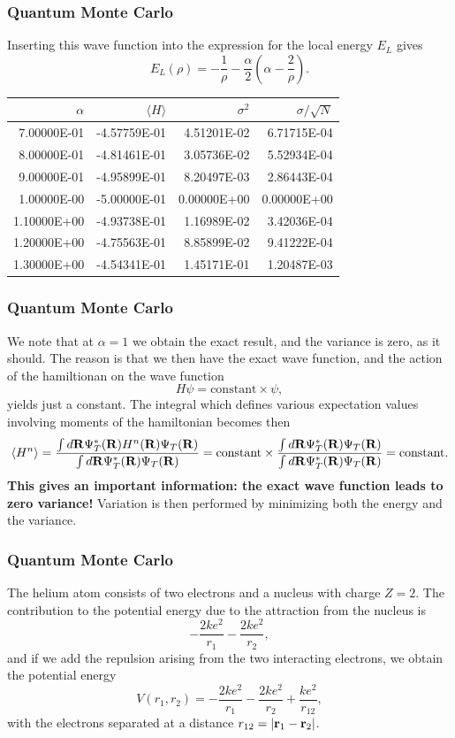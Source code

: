 \documentclass[compress]{beamer}
\begin{document}
\frame
{
  \frametitle{Quantum Monte Carlo}
\begin{small}
{\scriptsize
Inserting this wave function into the expression for the
local energy $E_L$ gives
\[
   E_L(\rho)=-\frac{1}{\rho}-
              \frac{\alpha}{2}\left(\alpha-\frac{2}{\rho}\right).
\]

\begin{tabular}{rrrr}\hline
$\alpha$&$\langle H \rangle $&$\sigma^2$&$\sigma/\sqrt{N}$ \\\hline
 7.00000E-01 & -4.57759E-01 &  4.51201E-02 &  6.71715E-04 \\ 
 8.00000E-01 & -4.81461E-01 &  3.05736E-02 &  5.52934E-04 \\ 
 9.00000E-01 & -4.95899E-01 &  8.20497E-03 &  2.86443E-04 \\ 
 1.00000E-00 & -5.00000E-01 &  0.00000E+00 &  0.00000E+00 \\ 
 1.10000E+00 & -4.93738E-01 &  1.16989E-02 &  3.42036E-04 \\ 
 1.20000E+00 & -4.75563E-01 &  8.85899E-02 &  9.41222E-04 \\ 
 1.30000E+00 & -4.54341E-01 &  1.45171E-01 &  1.20487E-03 \\ 
\end{tabular}
}
\end{small}
}


\frame
{
  \frametitle{Quantum Monte Carlo}
\begin{small}
{\scriptsize
We note that at $\alpha=1$ we obtain the exact
result, and the variance is zero, as it should. The reason is that 
we then have the exact wave function, and the action of the hamiltionan
on the wave function
\[
   H\psi = \mathrm{constant}\times \psi,
\]
yields just a constant. The integral which defines various 
expectation values involving moments of the hamiltonian becomes then
\[
   \langle H^n \rangle =
   \frac{\int d{\bf R}\Psi^{\ast}_T({\bf R})H^n({\bf R})\Psi_T({\bf R})}
        {\int d{\bf R}\Psi^{\ast}_T({\bf R})\Psi_T({\bf R})}=
\mathrm{constant}\times\frac{\int d{\bf R}\Psi^{\ast}_T({\bf R})\Psi_T({\bf R})}
        {\int d{\bf R}\Psi^{\ast}_T({\bf R})\Psi_T({\bf R})}=
\mathrm{constant}.
\]
{\bf This gives an important information: the exact wave function leads to zero variance!}
Variation is then performed by minimizing both the energy and the variance.
}
\end{small}
}


\frame
{
  \frametitle{Quantum Monte Carlo}
\begin{small}
{\scriptsize
The helium atom consists of two electrons and a nucleus with
charge $Z=2$. 
The contribution  
to the potential energy due to the attraction from the nucleus is
\[
   -\frac{2ke^2}{r_1}-\frac{2ke^2}{r_2},
\] 
and if we add the repulsion arising from the two 
interacting electrons, we obtain the potential energy
\[
 V(r_1, r_2)=-\frac{2ke^2}{r_1}-\frac{2ke^2}{r_2}+
               \frac{ke^2}{r_{12}},
\]
with the electrons separated at a distance 
$r_{12}=|{\bf r}_1-{\bf r}_2|$.
}
\end{small}
}
\end{document}
